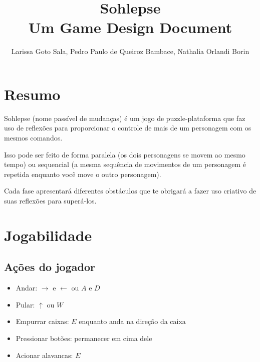 \documentclass[a4paper, 11pt]{article}
\title{\textbf{Sohlepse} \\ \small{Um Game Design Document}}
\author{Larissa Goto Sala, Pedro Paulo de Queiroz Bambace, Nathalia Orlandi Borin}
\begin{document}
 
 
\maketitle 
 
\newpage 
 
\newpage 
 
\section{Resumo} 
	 
	Sohlepse (nome passível de mudanças) é um jogo de puzzle-plataforma que faz uso de reflexões para proporcionar o controle de mais de um personagem com os mesmos comandos. 
 
Isso pode ser feito de forma paralela (os dois personagens se movem ao mesmo tempo) ou sequencial (a mesma sequência de movimentos de um personagem é repetida enquanto você move o outro personagem). 
 
Cada fase apresentará diferentes obstáculos que te obrigará a fazer uso criativo de suas reflexões para superá-los. 
 
\section{Jogabilidade} 
 
	\subsection{Ações do jogador} 
		\begin{itemize} 
			\item Andar: $\rightarrow$ e $\leftarrow$ ou $A$ e $D$  
			\item Pular: $\uparrow$ ou $W$
			\item Empurrar caixas: $E$ enquanto anda na direção da caixa  
			\item Pressionar botões: permanecer em cima dele 
			\item Acionar alavancas: $E$
		\end{itemize} 
 
\end{document}
